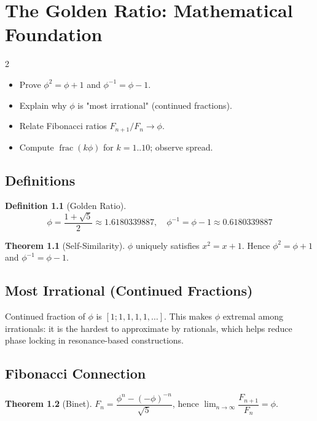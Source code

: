 \documentclass[11pt, a4paper, openany]{book}
\theoremstyle{definition}
\newtheorem{definition}{Definition}[chapter]
\newtheorem{theorem}{Theorem}[chapter]
\begin{document}
\chapter{The Golden Ratio: Mathematical Foundation}

\begin{todobox}{2}
\begin{itemize}
    \item[$\square$] Prove $\phi^2 = \phi + 1$ and $\phi^{-1} = \phi - 1$.
    \item[$\square$] Explain why $\phi$ is "most irrational" (continued fractions).
    \item[$\square$] Relate Fibonacci ratios $F_{n+1}/F_n \to \phi$.
    \item[$\square$] Compute $\operatorname{frac}(k\phi)$ for $k=1..10$; observe spread.
\end{itemize}
\end{todobox}

\section{Definitions}
\begin{definition}[Golden Ratio]
\begin{equation}
    \phi = \frac{1 + \sqrt{5}}{2} \approx 1.6180339887, \quad \phi^{-1} = \phi - 1 \approx 0.6180339887
\end{equation}
\end{definition}

\begin{theorem}[Self-Similarity]
$\phi$ uniquely satisfies $x^2 = x + 1$. Hence $\phi^2 = \phi + 1$ and $\phi^{-1} = \phi - 1$.
\end{theorem}

\section{Most Irrational (Continued Fractions)}
\begin{keyconceptbox}
Continued fraction of $\phi$ is $[1;1,1,1,1,\dots]$. This makes $\phi$ extremal among irrationals: it is the hardest to approximate by rationals, which helps reduce phase locking in resonance-based constructions.
\end{keyconceptbox}

\section{Fibonacci Connection}
\begin{theorem}[Binet]
$F_n = \dfrac{\phi^n - (-\phi)^{-n}}{\sqrt{5}}$, hence $\lim_{n\to\infty} \dfrac{F_{n+1}}{F_n} = \phi$.
\end{theorem}
\end{document}

